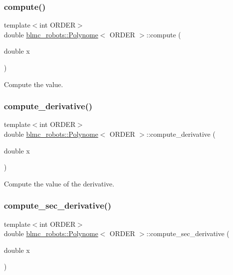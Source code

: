 \subsubsection{\texorpdfstring{compute()}{compute()}}
{\footnotesize\ttfamily template$<$int O\+R\+D\+ER$>$ \\
double \hyperlink{classblmc__robots_1_1Polynome}{blmc\+\_\+robots\+::\+Polynome}$<$ O\+R\+D\+ER $>$\+::compute (\begin{DoxyParamCaption}\item[{double}]{x }\end{DoxyParamCaption})}

Compute the value. \mbox{\label{classblmc__robots_1_1Polynome_a62183ec0d1bc22c224c14a58dd10e3e9}} 
\subsubsection{\texorpdfstring{compute\+\_\+derivative()}{compute\_derivative()}}
{\footnotesize\ttfamily template$<$int O\+R\+D\+ER$>$ \\
double \hyperlink{classblmc__robots_1_1Polynome}{blmc\+\_\+robots\+::\+Polynome}$<$ O\+R\+D\+ER $>$\+::compute\+\_\+derivative (\begin{DoxyParamCaption}\item[{double}]{x }\end{DoxyParamCaption})}

Compute the value of the derivative. \mbox{\label{classblmc__robots_1_1Polynome_a6a20495bd6c6105b5109244b29b5d069}} 
\subsubsection{\texorpdfstring{compute\+\_\+sec\+\_\+derivative()}{compute\_sec\_derivative()}}
{\footnotesize\ttfamily template$<$int O\+R\+D\+ER$>$ \\
double \hyperlink{classblmc__robots_1_1Polynome}{blmc\+\_\+robots\+::\+Polynome}$<$ O\+R\+D\+ER $>$\+::compute\+\_\+sec\+\_\+derivative (\begin{DoxyParamCaption}\item[{double}]{x }\end{DoxyParamCaption})}


